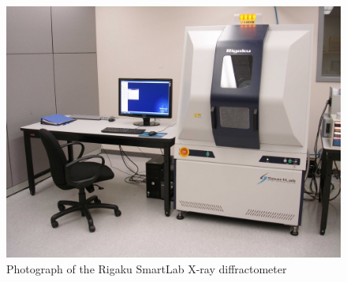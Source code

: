 
\begin{figure}[tbp]
   \centering
   \includegraphics[width=0.75\linewidth]{./figures/characterization/rigaku-smartlab-photo.jpg} 
   \caption[Rigaku SmartLab XRD]%
   		{Photograph of the Rigaku SmartLab X-ray diffractometer}
   \label{fig:rigaku-smartlab-photo}
\end{figure}



%


































	
	
	